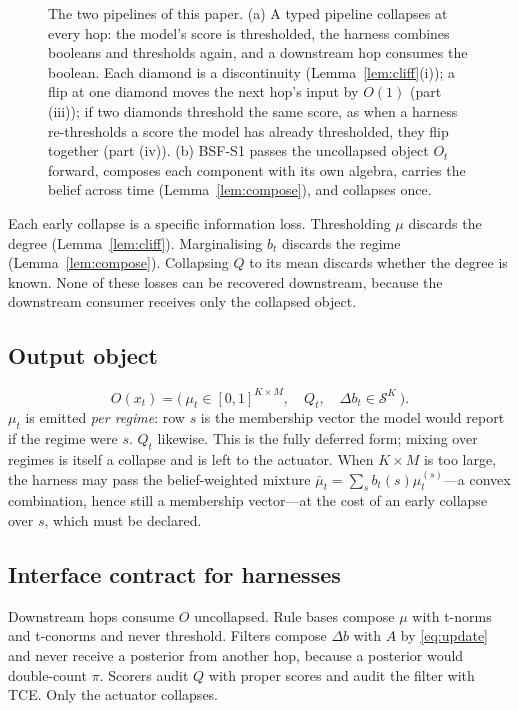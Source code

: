 \documentclass[11pt,a4paper]{article}
\numberwithin{equation}{section}
\theoremstyle{plain}
\theoremstyle{definition}
\theoremstyle{remark}
\newcommand{\simplex}{\mathcal{S}}
\begin{document}
\begin{figure}[t]
\centering
\resizebox{\textwidth}{!}{}
\caption{The two pipelines of this paper. (a) A typed pipeline collapses at every hop: the model's score is thresholded, the harness combines booleans and thresholds again, and a downstream hop consumes the boolean. Each diamond is a discontinuity (Lemma~\ref{lem:cliff}(i)); a flip at one diamond moves the next hop's input by $O(1)$ (part (iii)); if two diamonds threshold the same score, as when a harness re-thresholds a score the model has already thresholded, they flip together (part (iv)). (b) BSF-S1 passes the uncollapsed object $O_t$ forward, composes each component with its own algebra, carries the belief across time (Lemma~\ref{lem:compose}), and collapses once.}\label{fig:schematic}
\end{figure}

Each early collapse is a specific information loss. Thresholding $\mu$ discards the degree (Lemma~\ref{lem:cliff}). Marginalising $b_t$ discards the regime (Lemma~\ref{lem:compose}). Collapsing $Q$ to its mean discards whether the degree is known. None of these losses can be recovered downstream, because the downstream consumer receives only the collapsed object.

\subsection{Output object}

\begin{equation}\label{eq:output}
O(x_t) = \bigl(\ \mu_t\in[0,1]^{K\times M},\quad Q_t,\quad \Delta b_t\in\simplex^K\ \bigr).
\end{equation}
$\mu_t$ is emitted \emph{per regime}: row $s$ is the membership vector the model would report if the regime were $s$. $Q_t$ likewise. This is the fully deferred form; mixing over regimes is itself a collapse and is left to the actuator. When $K\times M$ is too large, the harness may pass the belief-weighted mixture $\bar\mu_t=\sum_s b_t(s)\mu_t^{(s)}$---a convex combination, hence still a membership vector---at the cost of an early collapse over $s$, which must be declared.

\subsection{Interface contract for harnesses}

Downstream hops consume $O$ uncollapsed. Rule bases compose $\mu$ with t-norms and t-conorms and never threshold. Filters compose $\Delta b$ with $A$ by \eqref{eq:update} and never receive a posterior from another hop, because a posterior would double-count $\pi$. Scorers audit $Q$ with proper scores and audit the filter with TCE. Only the actuator collapses.
\end{document}
